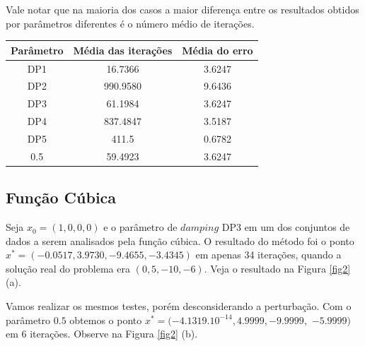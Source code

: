 \documentclass[12pt,a4paper]{article}
\begin{document}
	Vale notar que na maioria dos casos a maior diferença entre os resultados obtidos por parâmetros diferentes é o número médio de iterações.
	
	\begin{table}[H]
		\centering
		\begin{tabular}{|c|c|c|}
			\hline
			Parâmetro & Média das iterações & Média do erro\\
			\hline
			
			DP1 & 16.7366 & 3.6247\\
			\hline
			DP2 & 990.9580 & 9.6436\\ \hline
			DP3 & 61.1984 & 3.6247\\ \hline
			DP4 & 837.4847 & 3.5187\\ \hline
			DP5 & 411.5 & 0.6782\\ \hline
			0.5 & 59.4923 & 3.6247\\		\hline	
			
		\end{tabular}
	\end{table}
	\subsection{Função Cúbica} \label{cub}
		Seja $x_0 = (1, 0, 0,0)$ e o parâmetro de $damping$ DP3 em um dos conjuntos de dados a serem analisados pela função cúbica. O resultado do método foi o ponto $x^* = (-0.0517, 3.9730, -9.4655, -3.4345)$ em apenas 34 iterações, quando a solução real do problema era $(0,5,-10,-6).$ Veja o resultado na Figura \ref{fig2} (a).
	
	Vamos realizar os mesmos testes, porém desconsiderando a perturbação. Com o parâmetro $0.5$ obtemos o ponto $x^* = (-4.1319.10^{-14}, 4.9999, -9.9999,$ $ -5.9999)$ em 6 iterações. Observe na Figura \ref{fig2} (b).
	
\end{document}
